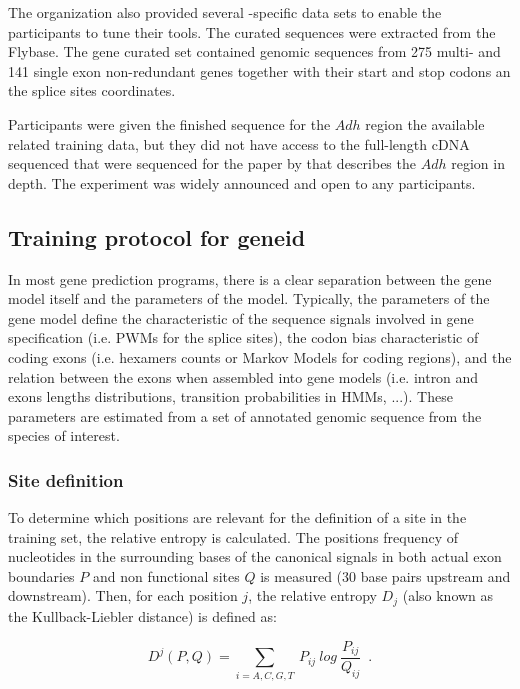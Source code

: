 The organization also provided several \Droso-specific data sets to
enable the participants to tune their tools. The curated sequences
were extracted from the Flybase. The gene curated set contained
genomic sequences from 275 multi- and 141 single exon non-redundant
genes together with their start and stop codons an the splice sites
coordinates.

Participants were given the finished sequence for the $Adh$ region the
available related training data, but they did not have access to the
full-length cDNA sequenced that were sequenced for the paper by
\cite{Ashburner:1999a} that describes the $Adh$ region in depth. The
experiment was widely announced and open to any participants.

\subsection{Training protocol for geneid}

In most gene prediction programs, there is a clear separation between
the gene model itself and the parameters of the model. Typically, the
parameters of the gene model define the characteristic of the sequence
signals involved in gene specification (i.e. PWMs for the splice
sites), the codon bias characteristic of coding exons (i.e. hexamers
counts or Markov Models for coding regions), and the relation between
the exons when assembled into gene models (i.e. intron and exons
lengths distributions, transition probabilities in HMMs, ...). These
parameters are estimated from a set of annotated genomic sequence from
the species of interest. 


\subsubsection{Site definition}

To determine which positions are relevant for the definition of a site
in the training set, the relative entropy is calculated. The positions
frequency of nucleotides in the surrounding bases of the canonical
signals in both actual exon boundaries $P$ and non functional sites
$Q$ is measured (30 base pairs upstream and downstream). Then, for
each position $j$, the relative entropy $D_j$ (also known as the
Kullback-Liebler distance) is defined as:

\begin{equation}
D^j (P,Q) =\sum_{i=A,C,G,T}\ P_{ij}\ log\ \frac{P_{ij}}{Q_{ij}}\,\,\,.
\end{equation}

